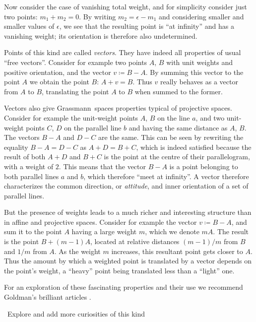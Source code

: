 \documentclass[\ifafour a4paper,12pt,\else a5paper,10pt,\fi%
onecolumn,oneside,article,%
british%
]{memoir}
\theoremstyle{remark}
\theoremstyle{innote}
\newcommand*{\defd}{\coloneqq}
\renewcommand*{\|}{\nonscript\,\vert\nonscript\;\mathopen{}}
\newcommand*{\puzzle}{{\fontencoding{U}\fontfamily{fontawesometwo}\selectfont\symbol{225}}}
\newcommand{\mynote}[1]{ {\color{notecolour}\puzzle\ #1}}
\newcommand*{\gm}{Grassmann}
\newcommand*{\ym}{m}
\newcommand*{\ya}{a}
\newcommand*{\yb}{b}
\begin{document}
Now consider the case of vanishing total weight, and for simplicity
consider just two points: $\ym_1 + \ym_2 = 0$. By writing $\ym_2 = \epsilon
-\ym_1$ and considering smaller and smaller values of $\epsilon$, we see
that the resulting point is \enquote{at infinity} and has a vanishing
weight; its orientation is therefore also undetermined.

Points of this kind are called \emph{vectors}. They have indeed all
properties of usual \enquote{free vectors}. Consider for example two points
$A$, $B$ with unit weights and positive orientation, and the vector
$v \defd B-A$. By summing this vector to the point $A$ we obtain the point
$B$: $A+v = B$. Thus $v$ really behaves as a vector from $A$ to $B$,
translating the point $A$ to $B$ when summed to the former.

Vectors also give \gm\ spaces properties typical of projective spaces.
Consider for example the unit-weight points $A$, $B$ on the line $\ya$, and
two unit-weight points $C$, $D$ on the parallel line $\yb$ and having the
same distance as $A$, $B$. The vectors $B-A$ and $D-C$ are the same. This
can be seen by rewriting the equality $B-A = D-C$ as $A+D = B+C$, which is
indeed satisfied because the result of both $A+D$ and $B+C$ is the point at
the centre of their parallelogram, with a weight of $2$. This means that
the vector $B-A$ is a point belonging to both parallel lines $\ya$ and
$\yb$, which therefore \enquote{meet at infinity}. A vector therefore
characterizes the common direction, or \emph{attitude}, and inner
orientation of a set of parallel lines.

But the presence of weights leads to a much richer and interesting
structure than in affine and projective spaces. Consider for example the
vector $v \defd B-A$, and sum it to the point $A$ having a large weight
$\ym$, which we denote $\ym A$. The result is the point $B+(\ym-1)A$,
located at relative distances $(\ym-1)/\ym$ from $B$ and $1/\ym$ from $A$.
As the weight $\ym$ increases, this resultant point gets closer to $A$.
Thus the amount by which a weighted point is translated by a vector depends
on the point's weight, a \enquote{heavy} point being translated less than a
\enquote{light} one.

For an exploration of these fascinating properties and their use we
recommend Goldman's brilliant articles \cite{goldman2000,goldman2002}.

\mynote{Explore and add more curiosities of this kind}


\medskip
\end{document}
